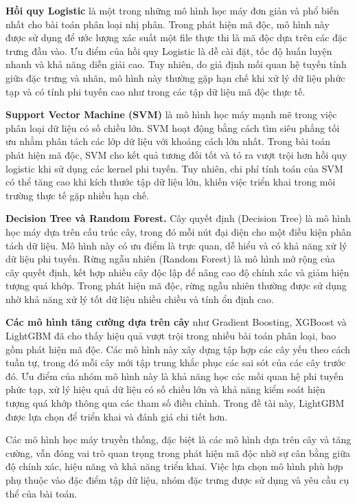 \textbf{Hồi quy Logistic} là một trong những mô hình học máy đơn giản
và phổ biến nhất cho bài toán phân loại nhị phân. Trong phát hiện mã
độc, mô hình này được sử dụng để ước lượng xác suất một file thực thi
là mã độc dựa trên các đặc trưng đầu vào. Ưu điểm của hồi quy
Logistic là dễ cài đặt, tốc độ huấn luyện nhanh và khả năng diễn giải
cao. Tuy nhiên, do giả định mối quan hệ tuyến tính giữa đặc trưng và
nhãn, mô hình này thường gặp hạn chế khi xử lý dữ liệu phức tạp và
có tính phi tuyến cao như trong các tập dữ liệu mã độc thực tế.

\textbf{Support Vector Machine (SVM)} là mô hình học máy mạnh mẽ trong
việc phân loại dữ liệu có số chiều lớn. SVM hoạt động bằng cách tìm
siêu phẳng tối ưu nhằm phân tách các lớp dữ liệu với khoảng cách lớn
nhất. Trong bài toán phát hiện mã độc, SVM cho kết quả tương đối tốt
và tỏ ra vượt trội hơn hồi quy logistic khi sử dụng các kernel phi
tuyến. Tuy nhiên, chi phí tính toán của SVM có thể tăng cao khi kích
thước tập dữ liệu lớn, khiến việc triển khai trong môi trường thực tế
gặp nhiều hạn chế.

\textbf{Decision Tree và Random Forest.} Cây quyết định (Decision Tree)
là mô hình học máy dựa trên cấu trúc cây, trong đó mỗi nút đại diện
cho một điều kiện phân tách dữ liệu. Mô hình này có ưu điểm là trực
quan, dễ hiểu và có khả năng xử lý dữ liệu phi tuyến. Rừng ngẫu nhiên
(Random Forest) là mô hình mở rộng của cây quyết định, kết hợp nhiều
cây độc lập để nâng cao độ chính xác và giảm hiện tượng quá khớp.
Trong phát hiện mã độc, rừng ngẫu nhiên thường được sử dụng nhờ khả
năng xử lý tốt dữ liệu nhiều chiều và tính ổn định cao.

\textbf{Các mô hình tăng cường dựa trên cây} như Gradient Boosting,
XGBoost và LightGBM đã cho thấy hiệu quả vượt trội trong nhiều bài
toán phân loại, bao gồm phát hiện mã độc. Các mô hình này xây dựng
tập hợp các cây yếu theo cách tuần tự, trong đó mỗi cây mới tập trung
khắc phục các sai sót của các cây trước đó. Ưu điểm của nhóm mô hình
này là khả năng học các mối quan hệ phi tuyến phức tạp, xử lý hiệu
quả dữ liệu có số chiều lớn và khả năng kiểm soát hiện tượng quá khớp
thông qua các tham số điều chỉnh. Trong đề tài này, LightGBM được lựa
chọn để triển khai và đánh giá chi tiết hơn.

Các mô hình học máy truyền thống, đặc biệt là các mô hình dựa trên
cây và tăng cường, vẫn đóng vai trò quan trọng trong phát hiện mã độc
nhờ sự cân bằng giữa độ chính xác, hiệu năng và khả năng triển khai.
Việc lựa chọn mô hình phù hợp phụ thuộc vào đặc điểm tập dữ liệu,
nhóm đặc trưng được sử dụng và yêu cầu cụ thể của bài toán.

